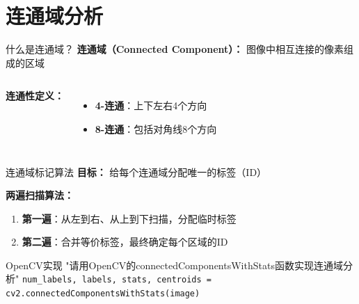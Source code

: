 \section{连通域分析}

\begin{frame}{什么是连通域？}
    \textbf{连通域（Connected Component）：} 图像中相互连接的像素组成的区域

    \vspace{0.3cm}

    \begin{columns}
        \textbf{连通性定义：}
        \begin{itemize}
            \item \textbf{4-连通}：上下左右4个方向
            \item \textbf{8-连通}：包括对角线8个方向
        \end{itemize}

        \begin{center}
        \end{center}
    \end{columns}
\end{frame}

\begin{frame}{连通域标记算法}
    \textbf{目标：} 给每个连通域分配唯一的标签（ID）

    \vspace{0.3cm}

    \textbf{两遍扫描算法：}
    \begin{enumerate}
        \item \textbf{第一遍}：从左到右、从上到下扫描，分配临时标签
        \item \textbf{第二遍}：合并等价标签，最终确定每个区域的ID
    \end{enumerate}

    \vspace{0.3cm}

    \begin{block}{OpenCV实现}
    \aihint{} "请用OpenCV的connectedComponentsWithStats函数实现连通域分析"
    \texttt{num\_labels, labels, stats, centroids = cv2.connectedComponentsWithStats(image)}
    \end{block}
\end{frame}

